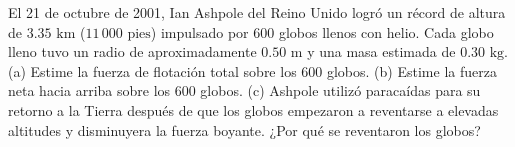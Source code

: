 \item El 21 de octubre de 2001, Ian Ashpole del Reino Unido logró un récord de altura de $3.35 \text{ km}$ ($11\,000 \text{ pies}$) impulsado por 600 globos llenos con helio. Cada globo lleno tuvo un radio de aproximadamente $0.50 \text{ m}$ y una masa estimada de $0.30 \text{ kg}$. (a) Estime la fuerza de flotación total sobre los 600 globos. (b) Estime la fuerza neta hacia arriba sobre los 600 globos. (c) Ashpole utilizó paracaídas para su retorno a la Tierra después de que los globos empezaron a reventarse a elevadas altitudes y disminuyera la fuerza boyante. ¿Por qué se reventaron los globos?
